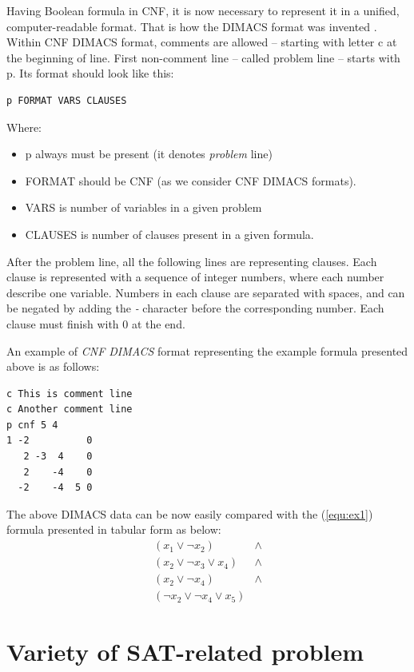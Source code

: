 \documentclass[12pt,english,pdflatex]{aghdpl}
\begin{document}
Having Boolean formula in CNF, it is now necessary to represent it
in a unified, computer-readable format. That is how the DIMACS format was invented \cite{Johnson:1996}.
Within CNF DIMACS format, comments are allowed -- starting with letter
c at the beginning of line. First non-comment line -- called problem
line -- starts with p. Its format should look like this:
\begin{lstlisting}
p FORMAT VARS CLAUSES
\end{lstlisting}
Where:
\begin{itemize}
\item p always must be present (it denotes \textit{problem} line)
\item FORMAT should be CNF (as we consider CNF DIMACS formats). 
\item VARS is number of variables in a given problem
\item CLAUSES is number of clauses present in a given formula.
\end{itemize}

After the problem line, all the following lines are representing clauses.
Each clause is represented with a sequence of integer numbers, where each number describe one variable.
Numbers in each clause are separated with spaces, and can be negated
by adding the \textit{-} character before the corresponding number. Each clause must
finish with 0 at the end.

An example of \textit{CNF DIMACS} format representing the example formula presented above is as follows:

\begin{lstlisting}
c This is comment line
c Another comment line
p cnf 5 4
1 -2          0
   2 -3  4    0
   2    -4    0
  -2    -4  5 0
\end{lstlisting}
The above DIMACS data can be now easily compared with the (\ref{equ:ex1}) formula presented
in tabular form as below:
\begin{equation}
\label{equ:ex1t}
\begin{array}{lc}
(x_{1}\vee \neg x_{2})          & \wedge  \\
(x_{2}\vee \neg x_{3}\vee x_{4}) & \wedge \\
(x_{2}\vee \neg x_{4})          & \wedge \\
(\neg x_{2}\vee \neg x_{4} \vee x_{5})
\end{array}
\end{equation}

\section{Variety of SAT-related problem}
\label{sat-relater}
\end{document}
